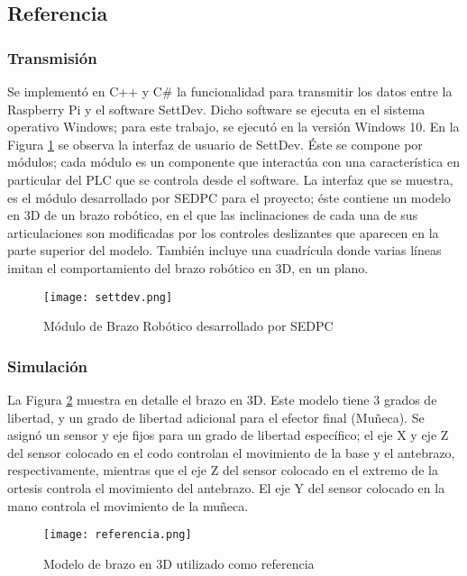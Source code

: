 \subsection{Referencia}

\subsubsection{Transmisión}

Se implementó en C++ y C\# la funcionalidad para transmitir los datos entre la Raspberry Pi y el software SettDev. Dicho software se ejecuta en el sistema operativo Windows; para este trabajo, se ejecutó en la versión Windows 10. En la Figura \ref{fig:settdev} se observa la interfaz de usuario de SettDev. Éste se compone por módulos; cada módulo es un componente que interactúa con una característica en particular del PLC que se controla desde el software. La interfaz que se muestra, es el módulo desarrollado por SEDPC para el proyecto; éste contiene un modelo en 3D de un brazo robótico, en el que las inclinaciones de cada una de sus articulaciones son modificadas por los controles deslizantes que aparecen en la parte superior del modelo. También incluye una cuadrícula donde varias líneas imitan el comportamiento del brazo robótico en 3D, en un plano.

\begin{figure}[htb]
	\centering
	\texttt{[image: settdev.png]}
	\caption{Módulo de Brazo Robótico desarrollado por SEDPC}
	\label{fig:settdev}
\end{figure}

\subsubsection{Simulación}

La Figura \ref{fig:referencia} muestra en detalle el brazo en 3D. Este modelo tiene 3 grados de libertad, y un grado de libertad adicional para el efector final (Muñeca). Se asignó un sensor y eje fijos para un grado de libertad específico; el eje X y eje Z del sensor colocado en el codo controlan el movimiento de la base y el antebrazo, respectivamente, mientras que el eje Z del sensor colocado en el extremo de la ortesis controla el movimiento del antebrazo. El eje Y del sensor colocado en la mano controla el movimiento de la muñeca.

\begin{figure}[htb]
	\centering
	\texttt{[image: referencia.png]}
	\caption{Modelo de brazo en 3D utilizado como referencia}
	\label{fig:referencia}
\end{figure}